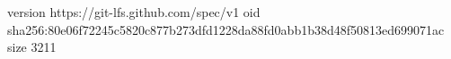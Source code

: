 version https://git-lfs.github.com/spec/v1
oid sha256:80e06f72245c5820c877b273dfd1228da88fd0abb1b38d48f50813ed699071ac
size 3211
